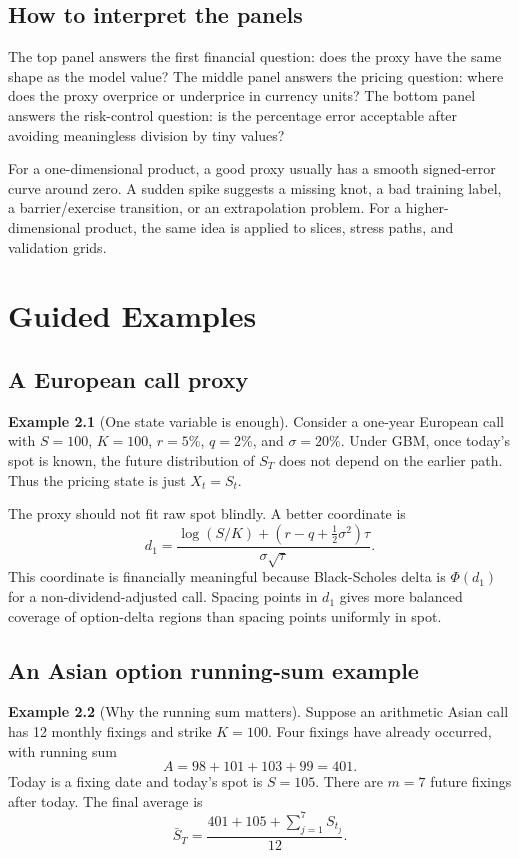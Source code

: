 \documentclass[11pt,oneside]{book}
\theoremstyle{definition}
\newtheorem{example}{Example}[chapter]
\begin{document}
\section{How to interpret the panels}
The top panel answers the first financial question: does the proxy have the same shape as the model value? The middle panel answers the pricing question: where does the proxy overprice or underprice in currency units? The bottom panel answers the risk-control question: is the percentage error acceptable after avoiding meaningless division by tiny values?

For a one-dimensional product, a good proxy usually has a smooth signed-error curve around zero. A sudden spike suggests a missing knot, a bad training label, a barrier/exercise transition, or an extrapolation problem. For a higher-dimensional product, the same idea is applied to slices, stress paths, and validation grids.

\chapter{Guided Examples}

\section{A European call proxy}
\begin{example}[One state variable is enough]
Consider a one-year European call with \(S=100\), \(K=100\), \(r=5\%\), \(q=2\%\), and \(\sigma=20\%\). Under GBM, once today's spot is known, the future distribution of \(S_T\) does not depend on the earlier path. Thus the pricing state is just \(X_t=S_t\).
\end{example}

The proxy should not fit raw spot blindly. A better coordinate is
\[
  d_1
  =
  \frac{\log(S/K)+(r-q+\tfrac12\sigma^2)\tau}{\sigma\sqrt{\tau}}.
\]
This coordinate is financially meaningful because Black-Scholes delta is \(\Phi(d_1)\) for a non-dividend-adjusted call. Spacing points in \(d_1\) gives more balanced coverage of option-delta regions than spacing points uniformly in spot.

\section{An Asian option running-sum example}
\begin{example}[Why the running sum matters]
Suppose an arithmetic Asian call has 12 monthly fixings and strike \(K=100\). Four fixings have already occurred, with running sum
\[
  A=98+101+103+99=401.
\]
Today is a fixing date and today's spot is \(S=105\). There are \(m=7\) future fixings after today. The final average is
\[
  \bar S_T
  =
  \frac{401+105+\sum_{j=1}^{7}S_{t_j}}{12}.
\]
\end{example}
\end{document}

